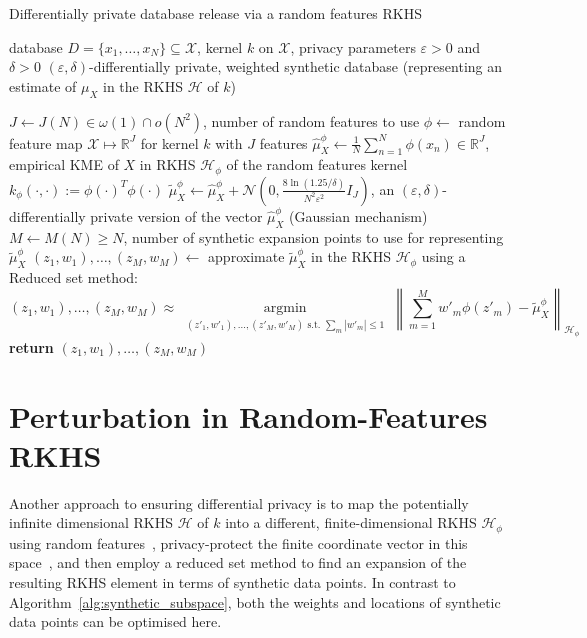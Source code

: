 \documentclass{article}
\newcommand{\argmin}{\operatorname*{argmin}}	%
\newcommand{\calH}{\mathcal{H}}			%
\newcommand{\calN}{\mathcal{N}}			%
\newcommand{\calX}{\mathcal{X}}			%
\newcommand{\IR}{\mathbb{R}}  			%
\theoremstyle{plain}
\theoremstyle{remark}
\theoremstyle{definition}
\begin{document}
\begin{algorithm*}
	\caption{Differentially private database release via a random features RKHS}
	\label{alg:random_features}
	\begin{algorithmic}[1]
		\REQUIRE database $D = \{ x_1, \ldots, x_N \} \subseteq \calX$, kernel $k$ on $\calX$, privacy parameters $\varepsilon > 0$ and $\delta > 0$
		\ENSURE $(\varepsilon, \delta)$-differentially private, weighted synthetic database (representing an estimate of $\mu_X$ in the RKHS $\calH$ of $k$)

		\STATE $J \gets J(N) \in \omega(1) \cap o(N^2)$, number of random features to use
		\STATE $\phi \gets$ random feature map $\calX \mapsto \IR^J$ for kernel $k$ with $J$ features
		\STATE $\hat{\mu}^{\phi}_X \gets \frac{1}{N} \sum_{n = 1}^N \phi(x_n) \in \IR^J$, empirical KME of $X$ in RKHS $\calH_{\phi}$ of the random features kernel $k_{\phi}(\cdot, \cdot) := \phi(\cdot)^T \phi(\cdot)$
		\STATE $\tilde{\mu}^{\phi}_X \gets \hat{\mu}^{\phi}_X + \calN(0, \frac{8 \ln(1.25 / \delta)}{N^2 \varepsilon^2} I_J)$, an $(\varepsilon, \delta)$-differentially private version of the vector $\hat{\mu}^{\phi}_X$ (Gaussian mechanism)
		\STATE $M \gets M(N) \geq N$, number of synthetic expansion points to use for representing $\tilde{\mu}^{\phi}_X$
		\STATE $(z_1, w_1), \ldots, (z_M, w_M) \gets$ approximate $\tilde{\mu}^{\phi}_X$ in the RKHS $\calH_{\phi}$ using a Reduced set method:
		\vspace{-0.5em}
		\begin{equation}
		(z_1, w_1), \ldots, (z_M, w_M)
		\approx
		\argmin_{\substack{(z'_1, w'_1), \ldots, (z'_M, w'_M)\text{ s.t. } \sum_m |w'_m| \leq 1}}
		\left\|
		\sum_{m = 1}^M w'_m \phi(z'_m) - \tilde{\mu}^{\phi}_X
		\right\|_{\calH_{\phi}}
		\label{eq:random_features_preimage_minimisation}
		\end{equation}
		\vspace{-1em}
		\STATE \textbf{return} $(z_1, w_1), \ldots, (z_M, w_M)$
	\end{algorithmic}
\end{algorithm*}



\section{Perturbation in Random-Features RKHS}
\label{sec:perturb_in_random_features_RKHS}

Another approach to ensuring differential privacy is to map the potentially infinite dimensional RKHS $\calH$ of $k$ into a different, finite-dimensional RKHS $\calH_{\phi}$ using random features~\cite{rahimi_random_2007}, privacy-protect the finite coordinate vector in this space~\cite{chaudhuri_differentially_2011}, and then employ a reduced set method to find an expansion of the resulting RKHS element in terms of synthetic data points. In contrast to Algorithm~\ref{alg:synthetic_subspace}, both the weights and locations of synthetic data points can be optimised here.
\end{document}
